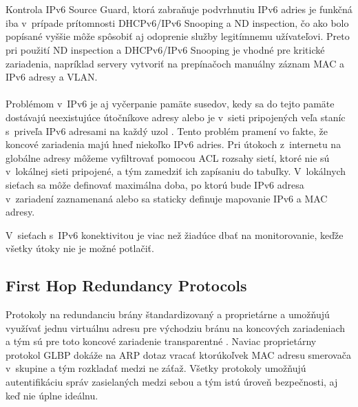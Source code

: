 \\\\   
\noindent
Kontrola IPv6 Source Guard, ktorá zabraňuje podvrhnutiu IPv6 adries je funkčná iba v~prípade prítomnosti DHCPv6/IPv6 Snooping a ND inspection, čo ako bolo popísané vyššie môže spôsobiť aj odoprenie služby legitímnemu užívateľovi. Preto pri použití ND inspection a DHCPv6/IPv6 Snooping je vhodné pre kritické zariadenia, napríklad servery vytvoriť na prepínačoch manuálny záznam MAC a IPv6 adresy a VLAN.    
\\\\   
\noindent
Problémom v~IPv6 je aj vyčerpanie pamäte susedov, kedy sa do tejto pamäte dostávajú neexistujúce útočníkove adresy alebo je v~sieti pripojených veľa staníc s~priveľa IPv6 adresami na každý uzol \cite{Podermanski1232015}\cite{Podermanski1932015}. Tento problém pramení vo fakte, že koncové zariadenia majú hneď niekoľko IPv6 adries. Pri útokoch z~internetu na globálne adresy môžeme vyfiltrovať pomocou ACL rozsahy sietí, ktoré nie sú v~lokálnej sieti pripojené, a tým zamedziť ich zapísaniu do tabuľky. V~lokálnych sieťach sa môže definovať maximálna doba, po ktorú bude IPv6 adresa v~zariadení zaznamenaná alebo sa staticky definuje mapovanie IPv6 a MAC adresy. 



V~sieťach s~IPv6 konektivitou je viac než žiadúce dbať na monitorovanie, keďže všetky útoky nie je možné potlačiť. 


\newpage
\subsection{First Hop Redundancy Protocols}
Protokoly na redundanciu brány štandardizovaný  a proprietárne  a  umožňujú využívať jednu virtuálnu adresu pre východziu bránu na koncových zariadeniach a tým sú pre toto koncové zariadenie transparentné \cite{Lammle2013}. Naviac proprietárny protokol GLBP dokáže na ARP dotaz vracať ktorúkoľvek MAC adresu smerovača v~skupine a tým rozkladať medzi ne záťaž. Všetky protokoly umožňujú autentifikáciu správ zasielaných medzi sebou a tým istú úroveň bezpečnosti, aj keď nie úplne ideálnu.  

